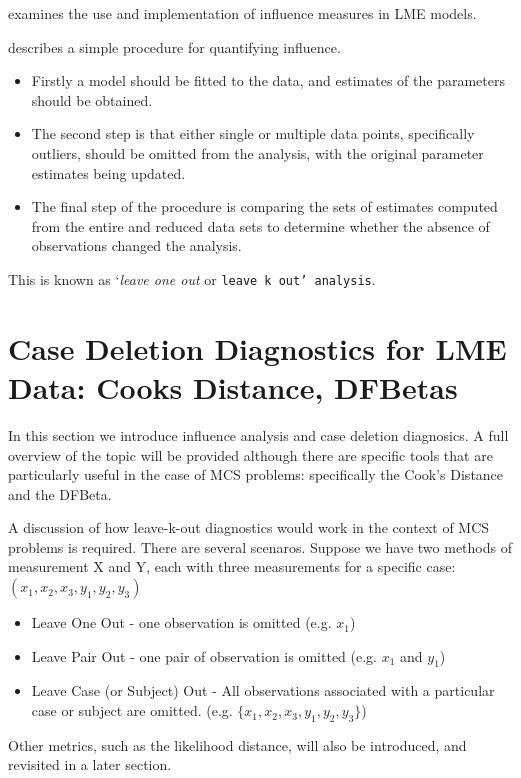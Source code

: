 \documentclass[12pt, a4paper]{report}
\theoremstyle{plain}
\theoremstyle{definition}
\theoremstyle{remark}
\begin{document}
\citet{schabenberger} examines the use and implementation of influence measures in LME models.


\citet{schabenberger} describes a simple procedure for quantifying influence.
\begin{itemize}
	\item Firstly a model should be fitted to the data, and
	estimates of the parameters should be obtained.
	\item The second step is that either single or multiple data points, specifically outliers,
	should be omitted from the analysis, with the original parameter
	estimates being updated.
	\item  The final step of the procedure is comparing the 	sets of estimates computed from the entire and reduced data sets
	to determine whether the absence of observations changed the
	analysis.
\end{itemize}
This is known as `\textit{leave one out} or \texttt{leave k
	out' analysis}.






\section*{Case Deletion Diagnostics for LME Data: Cooks Distance, DFBetas}
In this section we introduce influence analysis and case deletion diagnosics. A full overview of the topic will be provided although there are specific tools that are particularly useful in the case of MCS problems: specifically the Cook's Distance and the DFBeta.

A discussion of how leave-k-out diagnostics would work in the context of MCS problems is required. There are several scenaros. Suppose we have two methods of measurement X and Y, each with three measurements for a specific case: $(x_1,x_2,x_3,y_1,y_2,y_3)$

\begin{itemize}
	\item Leave One Out - one observation is omitted (e.g. $x_1$)
	\item Leave Pair Out - one pair of observation  is omitted (e.g. $x_1$ and $y_1$)
	\item Leave Case (or Subject) Out - All observations associated with a particular case or subject are omitted. (e.g. $\{x_1,x_2,x_3,y_1,y_2,y_3\}$)
\end{itemize}
Other metrics, such as the likelihood distance, will also be introduced, and revisited in a later section.
\end{document}
